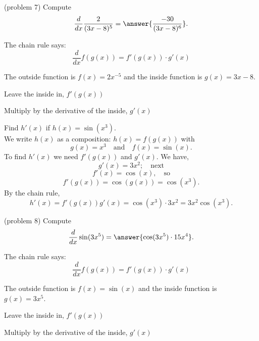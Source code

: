 \documentclass[handout]{ximera}
\begin{document}
\begin{problem}(problem 7)
  Compute
  \[
  \frac{d}{dx} \frac{2}{(3x - 8)^5} = \answer{\frac{-30}{(3x - 8)^6}}.
  \]
  
    \begin{hint}
      The chain rule says:
      \[
      \frac{d}{dx} f(g(x)) = f'(g(x))\cdot g'(x)
      \]
    \end{hint}
    \begin{hint}
      The outside function is $f(x) = 2x^{-5}$ and the inside
      function is $g(x) = 3x - 8$.
    \end{hint}
    
    \begin{hint}
		  Leave the inside in, $f'(g(x))$
		\end{hint}
		\begin{hint}
		  Multiply by the derivative of the inside, $g'(x)$
		\end{hint}
    
\end{problem}


\begin{example}[example 8]
Find $h'(x)$ if $h(x) = \sin(x^3)$.\\
We write $h(x)$ as a composition: $h(x)=f(g(x))$ with 
\[g(x) = x^3  \quad \text{and} \quad  f(x) = \sin(x).\] 
To find $h'(x)$ we need $f'(g(x))$ and $g'(x)$.  We have, 
\[g'(x) = 3x^2; \quad \text{next} \]
\[f'(x) =\cos(x) , \quad \text{so}\]
\[ f'(g(x)) = \cos(g(x)) = \cos(x^3).\]
By the chain rule,
\[h'(x) = f'(g(x))g'(x) = \cos(x^3)\cdot 3x^2 = 3x^2\cos(x^3).\]
\end{example}

\begin{center}
\begin{foldable}
\end{foldable}
\end{center}


\begin{problem}(problem 8)
  Compute
  \[
  \frac{d}{dx} \sin(3x^5) = \answer{\cos(3x^5)\cdot 15x^4}.
  \]
  
    \begin{hint}
      The chain rule says:
      \[
      \frac{d}{dx} f(g(x)) = f'(g(x))\cdot g'(x)
      \]
    \end{hint}
    \begin{hint}
      The outside function is $f(x) = \sin(x)$ and the inside
      function is $g(x) = 3x^5$.
    \end{hint}
    \begin{hint}
		  Leave the inside in, $f'(g(x))$
		\end{hint}
		\begin{hint}
		  Multiply by the derivative of the inside, $g'(x)$
		\end{hint}
    
\end{problem}
\end{document}
